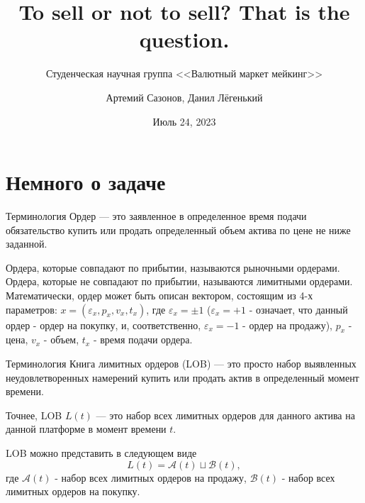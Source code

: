 \documentclass[aspectratio=169]{beamer}
\subtitle{Студенческая научная группа <<Валютный маркет мейкинг>>}
\title{To sell or not to sell? That is the question.}
\author{Артемий Сазонов, Данил Лёгенький}
\institute{МГУ имени М.В. Ломоносова, механико-математический факультет}
\date{Июль 24, 2023}
\begin{document}
    \maketitle
    \section{ Немного о задаче}
    


    \begin{frame}{Терминология}
        Ордер — это заявленное в определенное время подачи обязательство купить или продать определенный объем актива по цене не ниже заданной.

        Ордера, которые совпадают по прибытии, называются рыночными ордерами. Ордера, которые не совпадают по прибытии, называются лимитными ордерами. Математически, ордер может быть описан вектором, состоящим из 4-х параметров: $x = (\varepsilon_x, p_x, v_x, t_x) $, где $\varepsilon_x = \pm 1 $ ($\varepsilon_x = + 1$ - означает, что данный ордер - ордер на покупку, и, соответственно, $\varepsilon_x = - 1$ - ордер на продажу), $p_x$ - цена, $v_x$ - объем, $t_x$ - время подачи ордера.

    \end{frame}
    
    \begin{frame}{Терминология}
        Книга лимитных ордеров (LOB) — это просто 
        набор выявленных неудовлетворенных намерений купить или продать актив в определенный момент времени.

        Точнее, LOB $L(t)$ — это набор всех лимитных ордеров для данного актива на данной платформе в момент времени $t$.   

        LOB можно представить в следующем виде
        \begin{equation*}
            L(t) = \mathcal{A}(t) \sqcup \mathcal{B}(t),
        \end{equation*}
        где $\mathcal{A}(t)$ - набор всех лимитных ордеров на продажу, $\mathcal{B}(t)$ - набор всех лимитных ордеров на покупку. 
    \end{frame}
\end{document}
